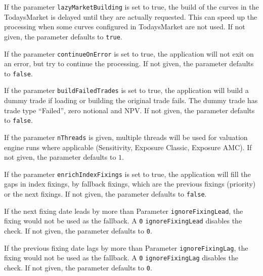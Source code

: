 {\medskip If the parameter {\tt lazyMarketBuilding} is set to true, the build of the curves in the TodaysMarket is
delayed until they are actually requested. This can speed up the processing when some curves configured in TodaysMarket
are not used. If not given, the parameter defaults to {\tt true}.

\medskip If the parameter {\tt continueOnError} is set to true, the application will not exit on an error, but try to
continue the processing. If not given, the parameter defaults to {\tt false}.

\medskip If the parameter {\tt buildFailedTrades} is set to true, the application will build a dummy trade if loading or
building the original trade fails. The dummy trade has trade type ``Failed'', zero notional and NPV.
If not given, the parameter defaults to {\tt false}.

\medskip If the parameter {\tt nThreads} is given, multiple threads will be used for valuation engine runs where
applicable (Sensitivity, Exposure Classic, Exposure AMC). If not given, the parameter defaults to $1$.

\medskip If the parameter {\tt enrichIndexFixings} is set to true, the application will fill the gaps in index fixings, 
by fallback fixings, which are the previous fixings (priority) or the next fixings.
If not given, the parameter defaults to {\tt false}.

\medskip If the next fixing date leads by more than Parameter {\tt ignoreFixingLead}, the fixing would not be used as the fallback.
A {\tt 0} {\tt ignoreFixingLead} disables the check.
If not given, the parameter defaults to {\tt 0}.

\medskip If the previous fixing date lags by more than Parameter {\tt ignoreFixingLag}, the fixing would not be used as the fallback.
A {\tt 0} {\tt ignoreFixingLag} disables the check.
If not given, the parameter defaults to {\tt 0}.

}
